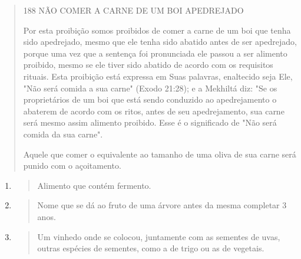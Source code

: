 \begin{quote}
188 NÃO COMER A CARNE DE UM BOI APEDREJADO

Por esta proibição somos proibidos de comer a carne de um boi que tenha
sido apedrejado, mesmo que ele tenha sido abatido antes de ser
apedre­jado, porque uma vez que a sentença foi pronunciada ele passou a
ser alimento proibido, mesmo se ele tiver sido abatido de acordo com os
requisitos rituais. Esta proibição está expressa em Suas palavras,
enaltecido seja Ele, "Não será comida a sua carne" (Exodo 21:28); e a
Mekhiltá diz: "Se os proprietários de um boi que está sendo conduzido ao
apedrejamento o abaterem de acordo com os ritos, antes de seu
apedrejamento, sua carne será mesmo assim alimento proi­bido. Esse é o
significado de "Não será comida da sua carne".

Aquele que comer o equivalente ao tamanho de uma oliva de sua carne será
punido com o açoitamento.
\end{quote}

\begin{enumerate}
\def\labelenumi{\arabic{enumi}.}
\setcounter{enumi}{357}
\item
  \begin{quote}
  Alimento que contém fermento.
  \end{quote}
\item
  \begin{quote}
  Nome que se dá ao fruto de uma árvore antes da mesma completar 3 anos.
  \end{quote}
\item
  \begin{quote}
  Um vinhedo onde se colocou, juntamente com as sementes de uvas, outras
  espécies de se­mentes, como a de trigo ou as de vegetais.
  \end{quote}
\end{enumerate}

